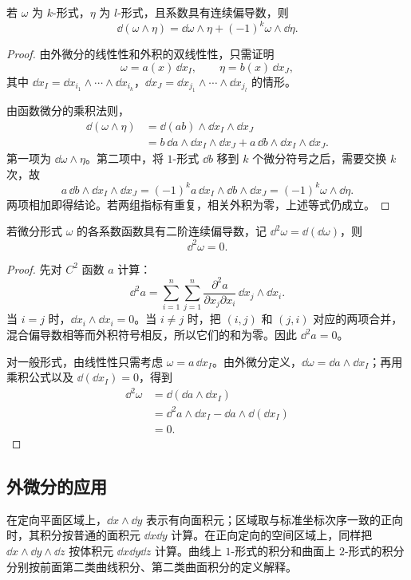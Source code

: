 \begin{proposition}
若 $\omega$ 为 $k$-形式，$\eta$ 为 $l$-形式，且系数具有连续偏导数，则
\[
\dd(\omega\wedge\eta)
=\dd\omega\wedge\eta+(-1)^k\omega\wedge\dd\eta.
\]
\end{proposition}
\begin{proof}
由外微分的线性性和外积的双线性性，只需证明
\[
\omega=a(x)\,\dd x_I,\qquad \eta=b(x)\,\dd x_J,
\]
其中 $\dd x_I=\dd x_{i_1}\wedge\cdots\wedge\dd x_{i_k}$，$\dd x_J=\dd x_{j_1}\wedge\cdots\wedge\dd x_{j_l}$ 的情形。

由函数微分的乘积法则，
\begin{align*}
\dd(\omega\wedge\eta)
&=\dd(ab)\wedge\dd x_I\wedge\dd x_J\\
&=b\,\dd a\wedge\dd x_I\wedge\dd x_J
 +a\,\dd b\wedge\dd x_I\wedge\dd x_J.
\end{align*}
第一项为 $\dd\omega\wedge\eta$。第二项中，将 $1$-形式 $\dd b$ 移到 $k$ 个微分符号之后，需要交换 $k$ 次，故
\[
a\,\dd b\wedge\dd x_I\wedge\dd x_J
=(-1)^ka\,\dd x_I\wedge\dd b\wedge\dd x_J
=(-1)^k\omega\wedge\dd\eta.
\]
两项相加即得结论。若两组指标有重复，相关外积为零，上述等式仍成立。
\end{proof}

\begin{proposition}
若微分形式 $\omega$ 的各系数函数具有二阶连续偏导数，记 $\dd^2\omega=\dd(\dd\omega)$，则
\[
\dd^2\omega=0.
\]
\end{proposition}
\begin{proof}
先对 $C^2$ 函数 $a$ 计算：
\[
\dd^2a=\sum_{i=1}^n\sum_{j=1}^n
 \frac{\partial^2a}{\partial x_j\partial x_i}\,\dd x_j\wedge\dd x_i.
\]
当 $i=j$ 时，$\dd x_i\wedge\dd x_i=0$。当 $i\ne j$ 时，把 $(i,j)$ 和 $(j,i)$ 对应的两项合并，混合偏导数相等而外积符号相反，所以它们的和为零。因此 $\dd^2a=0$。

对一般形式，由线性性只需考虑 $\omega=a\,\dd x_I$。由外微分定义，$\dd\omega=\dd a\wedge\dd x_I$；再用乘积公式以及 $\dd(\dd x_I)=0$，得到
\begin{align*}
\dd^2\omega
&=\dd(\dd a\wedge\dd x_I)\\
&=\dd^2a\wedge\dd x_I-\dd a\wedge\dd(\dd x_I)\\
&=0.
\end{align*}
\end{proof}

\subsection*{外微分的应用}
在定向平面区域上，$\dd x\wedge\dd y$ 表示有向面积元；区域取与标准坐标次序一致的正向时，其积分按普通的面积元 $\dd x\dd y$ 计算。在正向定向的空间区域上，同样把 $\dd x\wedge\dd y\wedge\dd z$ 按体积元 $\dd x\dd y\dd z$ 计算。曲线上 $1$-形式的积分和曲面上 $2$-形式的积分分别按前面第二类曲线积分、第二类曲面积分的定义解释。

